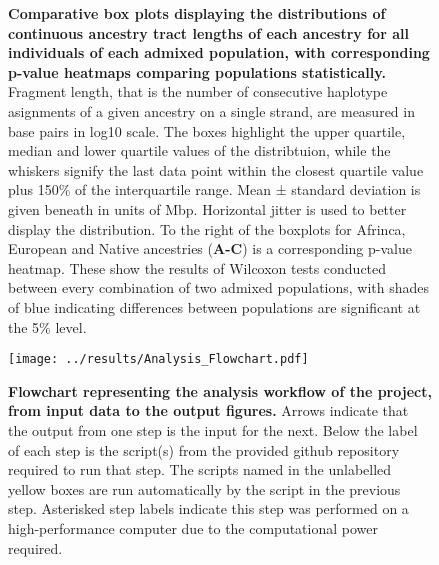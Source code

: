 \documentclass[11pt]{article}
\begin{document}
\begin{figure}[htb!]%
    \centering
     \hspace*{0em}
        \vspace{-0.6cm}
        \caption{\textbf{
            Comparative box plots displaying the distributions of continuous ancestry tract lengths of each ancestry for all individuals of each admixed population, with corresponding p-value heatmaps comparing populations statistically.
        }
        Fragment length, that is the number of consecutive haplotype asignments of a given ancestry on a single strand, are measured in base pairs in log10 scale. The boxes highlight the upper quartile, median and lower quartile values of the distribtuion, while the whiskers signify the last data point within the closest quartile value plus 150\% of the interquartile range. Mean ± standard deviation is given beneath in units of Mbp. Horizontal jitter is used to better display the distribution. To the right of the boxplots for Afrinca, European and Native ancestries (\textbf{A-C}) is a corresponding p-value heatmap. These show the results of Wilcoxon tests conducted between every combination of two admixed populations, with shades of blue indicating differences between populations are significant at the 5\% level.
        }
\end{figure}




\begin{figure}[htb!]%
    \centering
    \texttt{[image: ../results/Analysis\_Flowchart.pdf]} 
    \vspace{-2.5cm}
    \caption{\textbf{
        Flowchart representing the analysis workflow of the project, from input data to the output figures. 
    }
        Arrows indicate that the output from one step is the input for the next. Below the label of each step is the script(s) from the provided github repository required to run that step. The scripts named in the unlabelled yellow boxes are run automatically by the script in the previous step. Asterisked step labels indicate this step was performed on a high-performance computer due to the computational power required.
    }
\end{figure}
\end{document}
